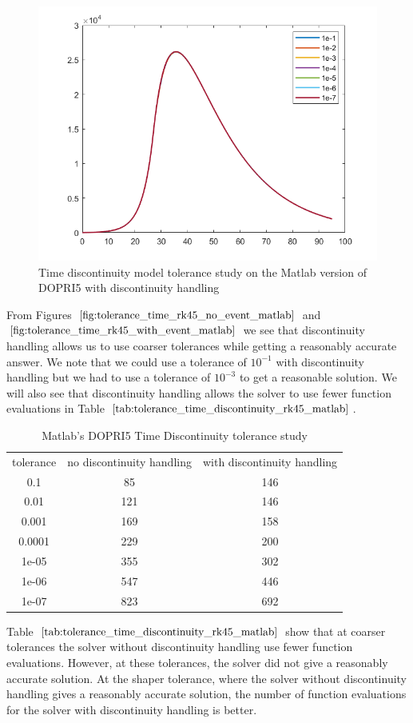 \begin{figure}[h]
\centering
\includegraphics[width=0.7\linewidth]{./figures/tolerance_time_rk45_with_event_matlab}
\caption{Time discontinuity model tolerance study on the Matlab version of DOPRI5 with discontinuity handling}
\label{fig:tolerance_time_rk45_with_event_matlab}
\end{figure}

From Figures $\ref{fig:tolerance_time_rk45_no_event_matlab}$ and $\ref{fig:tolerance_time_rk45_with_event_matlab}$ we see that discontinuity handling allows us to use coarser tolerances while getting a reasonably accurate answer. We note that we could use a tolerance of $10^{-1}$ with discontinuity handling but we had to use a tolerance of $10^{-3}$ to get a reasonable solution. We will also see that discontinuity handling allows the solver to use fewer function evaluations in Table $\ref{tab:tolerance_time_discontinuity_rk45_matlab}$.

\begin{table}[h]
\caption {Matlab's DOPRI5 Time Discontinuity tolerance study} 
\label{tab:tolerance_time_discontinuity_rk45_matlab} 
\begin{center}
\begin{tabular}{ c c c }
tolerance & no discontinuity handling & with discontinuity handling\\ 
0.1 & 85 & 146 \\
0.01 & 121 & 146 \\
0.001 & 169 & 158 \\
0.0001 & 229 & 200 \\
1e-05 & 355 & 302 \\
1e-06 & 547 & 446 \\
1e-07 & 823 & 692 \\
\end{tabular}
\end{center}
\end{table}

Table $\ref{tab:tolerance_time_discontinuity_rk45_matlab}$ show that at coarser tolerances the solver without discontinuity handling use fewer function evaluations. However, at these tolerances, the solver did not give a reasonably accurate solution. At the shaper tolerance, where the solver without discontinuity handling gives a reasonably accurate solution, the number of function evaluations for the solver with discontinuity handling is better. 

